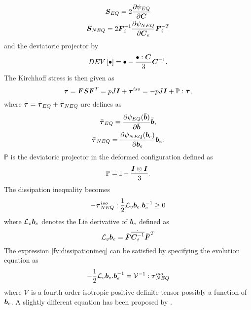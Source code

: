 \documentclass[11pt,twoside,TimesRoman]{article}
\newcommand{\parder}[2]{{\dfrac{\partial #1}{\partial #2}}}
\begin{document}
\begin{gather}
\bfS_{EQ} = 2\parder{\psi_{EQ}}{\bfC} \\
\bfS_{NEQ} = 2 \bfF_i^{-1} \parder{\psi_{NEQ}}{\bfC_e}\bfF_i^{-T}
\end{gather}
and the deviatoric projector by
\begin{equation}
DEV\left[ \bullet\right] = \bullet - \frac{\bullet:\mbox{\boldmath $C$}}{3} \mbox{\boldmath $C$}^{-1}.
\end{equation}
The Kirchhoff stress is then given as
\begin{equation}
	\boldsymbol{\tau} = \mbox{\boldmath $F$} \mbox{\boldmath $S$} \mbox{\boldmath $F$}^T = pJ\mbox{\boldmath $I$} + {\mbox{\boldmath $\tau$}}^{iso} = -pJ\mbox{\boldmath $I$} + \mathbb{P}:\bar{\mbox{\boldmath $\tau$}},
\end{equation}
where $\bar{\mbox{\boldmath $\tau$}} = \bar{\mbox{\boldmath $\tau$}}_{EQ} + \bar{\mbox{\boldmath $\tau$}}_{NEQ}$ are defines as 
\begin{gather}
	\bar{\bftau}_{EQ} = \parder{\psi_{EQ}(\bar{\bfb})}{\bar{\bfb}}\bar{\bfb}, \\
	\bar{\bftau}_{NEQ} = \parder{\psi_{NEQ}({\bfb}_e)}{{\bfb}_e}{{\bfb}_e}.
\end{gather}
$\mathbb{P}$ is the deviatoric projector in the deformed configuration defined as 
\begin{equation}
\mathbb{P} = \mathbb{I} - \frac{\mbox{\boldmath $I$} \otimes \mbox{\boldmath $I$}}{3}.
\end{equation}
The dissipation inequality becomes 
\begin{equation}
-\boldsymbol{\tau}_{NEQ}^{iso}:\frac{1}{2} \mathcal{L}_v\mbox{\boldmath $b$}_e. \mbox{\boldmath $b$}_e^{-1} \geq 0
\label{fv:dissipationineq}
\end{equation}
where $\mathcal{L}_v\mbox{\boldmath $b$}_e$ denotes the Lie derivative of $\mbox{\boldmath $b$}_e$ defined as 
\begin{equation}
\mathcal{L}_v\mbox{\boldmath $b$}_e = \bar{\mbox{\boldmath $F$}} \dot{\overline{ \mbox{\boldmath $C$}_i^{-1}}} \bar{\mbox{\boldmath $F$}}^T
\end{equation}
The expression \ref{fv:dissipationineq} can be satisfied by specifying the evolution equation as
\begin{equation}
-\frac{1}{2} \mathcal{L}_v\mbox{\boldmath $b$}_e. \mbox{\boldmath $b$}_e^{-1}  = \mathcal{V}^{-1} : \boldsymbol{\tau}_{NEQ}^{iso}
\label{fv:evolution}
\end{equation}
where $\mathcal{V}$ is a fourth order isotropic positive definite tensor possibly a function of $\mbox{\boldmath $b$}_e$. A slightly different equation has been proposed by \cite{Bergstrom1998}.
\end{document}
